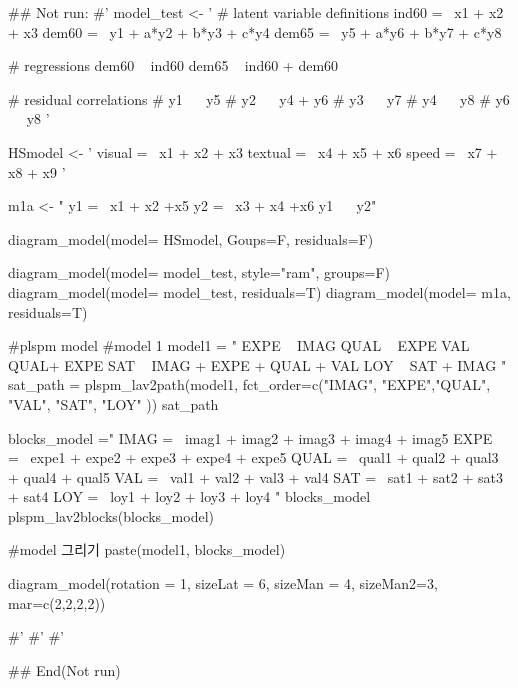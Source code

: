 \documentclass[a4paper]{book}
\begin{document}
\begin{Examples}
\begin{ExampleCode}
\#\# Not run: 
#'
model_test <- '
  # latent variable definitions
     ind60 =~ x1 + x2 + x3
     dem60 =~ y1 + a*y2 + b*y3 + c*y4
     dem65 =~ y5 + a*y6 + b*y7 + c*y8

  # regressions
    dem60 ~ ind60
    dem65 ~ ind60 + dem60

  # residual correlations
    # y1 ~~ y5
    # y2 ~~ y4 + y6
    # y3 ~~ y7
    # y4 ~~ y8
    # y6 ~~ y8
'

HSmodel <- ' visual  =~ x1 + x2 + x3
             textual =~ x4 + x5 + x6
             speed   =~ x7 + x8 + x9 '


m1a <- "
y1 =~ x1 + x2 +x5
y2 =~ x3 + x4 +x6
y1 ~~ y2"

diagram_model(model= HSmodel, Goups=F,  residuals=F)

diagram_model(model= model_test, style="ram", groups=F)
diagram_model(model= model_test, residuals=T)
diagram_model(model= m1a, residuals=T)


#plspm model
#model 1
model1 = "
EXPE ~ IMAG
QUAL ~ EXPE
VAL ~  QUAL+ EXPE
SAT ~ IMAG + EXPE + QUAL + VAL
LOY ~ SAT + IMAG
"
sat_path = plspm_lav2path(model1,
                          fct_order=c("IMAG", "EXPE","QUAL", "VAL", "SAT", "LOY" ))
sat_path

blocks_model ="
IMAG =~ imag1 + imag2 + imag3 + imag4 + imag5
EXPE =~ expe1 + expe2 + expe3 + expe4 + expe5
QUAL =~ qual1 + qual2 + qual3 + qual4 + qual5
VAL =~ val1 + val2 + val3 + val4
SAT =~ sat1 + sat2 + sat3 + sat4
LOY =~ loy1 + loy2 + loy3 + loy4
"
blocks_model
plspm_lav2blocks(blocks_model)

#model 그리기
paste(model1, blocks_model)%

  diagram_model(rotation = 1, sizeLat = 6, sizeMan = 4, sizeMan2=3,
                mar=c(2,2,2,2))

#'
#'
#'

## End(Not run)
\end{ExampleCode}
\end{Examples}
\end{document}
